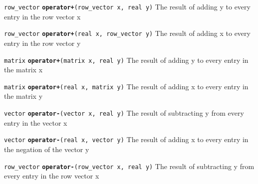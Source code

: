 \documentclass[
  10pt,
]{book}
\begin{document}

\texttt{row\_vector} \textbf{\texttt{operator+}}\texttt{(row\_vector\ x,\ real\ y)}\newline
The result of adding y to every entry in the row vector x


\texttt{row\_vector} \textbf{\texttt{operator+}}\texttt{(real\ x,\ row\_vector\ y)}\newline
The result of adding x to every entry in the row vector y


\texttt{matrix} \textbf{\texttt{operator+}}\texttt{(matrix\ x,\ real\ y)}\newline
The result of adding y to every entry in the matrix x


\texttt{matrix} \textbf{\texttt{operator+}}\texttt{(real\ x,\ matrix\ y)}\newline
The result of adding x to every entry in the matrix y


\texttt{vector} \textbf{\texttt{operator-}}\texttt{(vector\ x,\ real\ y)}\newline
The result of subtracting y from every entry in the vector x


\texttt{vector} \textbf{\texttt{operator-}}\texttt{(real\ x,\ vector\ y)}\newline
The result of adding x to every entry in the negation of the vector y


\texttt{row\_vector} \textbf{\texttt{operator-}}\texttt{(row\_vector\ x,\ real\ y)}\newline
The result of subtracting y from every entry in the row vector x

\end{document}
